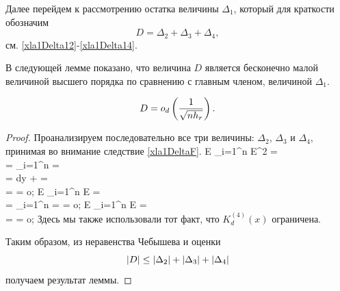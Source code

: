 \documentclass[a4paper,14pt,russian]{article}
\begin{document}
Далее перейдем к рассмотрению остатка величины $\Delta_1$, который для краткости обозначим
$$
D= \Delta_{2}+\Delta_{3}+\Delta_{4},
$$
см. \eqref{xla1Delta12}-\eqref{xla1Delta14}.


В следующей лемме показано, что величина $D$ является бесконечно малой величиной высшего порядка по сравнению с главным членом, величиной $\Delta_{1}$.
\begin{lemma}\label{xla1D}
$$
D=o_d\left(\frac{1}{\sqrt{n h_r}}\right).
$$
\end{lemma}

\begin{proof}
Проанализируем последовательно все три величины: $\Delta_{2}$, $\Delta_{3}$ и $\Delta_{4}$, принимая во внимание следствие \eqref{xla1DeltaF}.
\ml
{
E\leq {} \sum_{i=1}^n   E^2 =\\=   \sum_{i=1}^n   =\\=  dy +   =\\=   = o;
}
\ml
{
E\leq {} \sum_{i=1}^n   E = \\=   \sum_{i=1}^n   =   = o;
}
\ml
{
E\leq {} \sum_{i=1}^n   E =\\=  = o;
}
Здесь мы также использовали тот факт, что $K_d^{(4)}(x)$ ограничена.

Таким образом, из неравенства Чебышева и оценки
$$
\left|D\right| \leq \left|\Delta_{2}\right|+\left|\Delta_{3}\right|+\left|\Delta_{4}\right|
$$
получаем результат леммы.
\end{proof}
\end{document}
